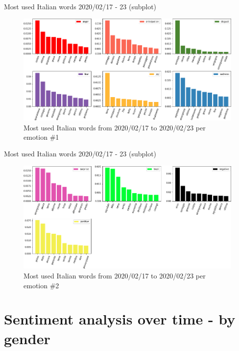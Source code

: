 \documentclass[8pt]{beamer}  %
\begin{document}
\begin{frame}{Most used Italian words 2020/02/17 - 23 (subplot)}
	
	\begin{figure}[h]
    	\includegraphics[scale=.32]{assets/img/it_2020_02_17_most_used_words_subplots_1.png}
    	\caption{Most used Italian words from 2020/02/17 to 2020/02/23 per emotion \#1}
    	\label{fig:it_2020_02_17_most_used_words_subplots_1}
    \end{figure}
	
\end{frame}

\begin{frame}{Most used Italian words 2020/02/17 - 23 (subplot)}
	
	\begin{figure}[h]
    	\includegraphics[scale=.32]{assets/img/it_2020_02_17_most_used_words_subplots_2.png}
    	\caption{Most used Italian words from 2020/02/17 to 2020/02/23 per emotion \#2}
    	\label{fig:it_2020_02_17_most_used_words_subplots_2}
    \end{figure}
	
\end{frame}
\section{Sentiment analysis over time - by gender}
\end{document}
